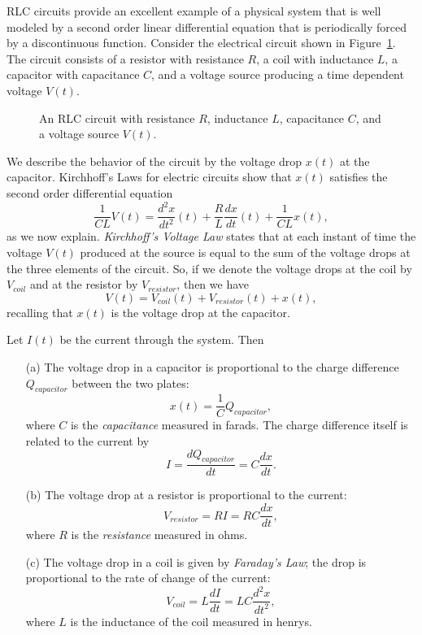 \documentclass{ximera}
\begin{document}
RLC circuits provide an excellent example of a physical system that is well
modeled by a second order linear differential equation that is periodically 
forced by a discontinuous function.  Consider the electrical circuit shown in 
Figure~\ref{fig:rcl}.  The circuit consists of a resistor with
resistance $R$, a coil with inductance $L$, a 
capacitor with 
capacitance $C$, and a voltage source producing a time 
dependent voltage $V(t)$.    
\begin{figure}[htb]
           \centerline{%
           }
           \caption{An RLC circuit with resistance $R$, inductance $L$,
	   capacitance $C$, and a voltage source $V(t)$.}
           \label{fig:rcl}
\end{figure}

We describe the behavior of the circuit by the voltage drop $x(t)$ at the 
capacitor.  Kirchhoff's Laws 
for electric circuits show that $x(t)$ satisfies 
the second order differential equation
\begin{equation}  \label{e:eleccirc}
\frac{1}{CL}V(t) = \frac{d^2x}{dt^2}(t) + \frac{R}{L}\frac{dx}{dt}(t) + 
\frac{1}{CL}x(t),
\end{equation}
as we now explain.   {\em Kirchhoff's Voltage 
Law\/} states that at each
instant of time the voltage $V(t)$ produced at the source is
equal to the sum of the voltage drops at the three elements of
the circuit.  So, if we denote the voltage drops at the coil
by $V_{coil}$ and at the resistor by $V_{resistor}$, then 
we have 
\begin{equation}  \label{e:kirchhoff}
V(t) = V_{coil}(t) + V_{resistor}(t) + x(t),
\end{equation}
recalling that $x(t)$ is the voltage drop at the capacitor.

Let $I(t)$ be the current through the system.  Then 
\begin{itemize}
\item[(a)]  The voltage drop in a capacitor is proportional to the charge 
difference $Q_{capacitor}$ between the two plates:
\[
x(t) = \frac{1}{C}Q_{capacitor},
\]
where $C$ is the {\em capacitance\/} measured in farads.  The charge 
difference itself is related to the current by 
\[
I = \frac{dQ_{capacitor}}{dt} = C\frac{dx}{dt}.
\]
\item[(b)]  The voltage drop at a resistor is proportional to the current:	
\[
V_{resistor} = RI = RC\frac{dx}{dt},
\]
where $R$ is the {\em resistance\/} measured in ohms.
\item[(c)]  The voltage drop in a coil is given by 
{\em Faraday's Law}; 
the drop is proportional to the rate of change of the current:
\[
V_{coil} = L\frac{dI}{dt} = LC\frac{d^2x}{dt^2},
\]
where $L$ is the inductance of the coil measured in henrys.
\end{itemize}
\end{document}
